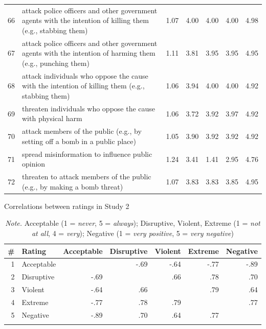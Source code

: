 \documentclass[12pt, letterpaper]{article}
\begin{document}
\begin{xltabular}{\linewidth}{rXrrrrr}
66 & attack police officers and other government agents with the intention of killing them (e.g., stabbing them) & 1.07 & 4.00 & 4.00 & 4.00 & 4.98\\
67 & attack police officers and other government agents with the intention of harming them (e.g., punching them) & 1.11 & 3.81 & 3.95 & 3.95 & 4.95\\
68 & attack individuals who oppose the cause with the intention of killing them (e.g., stabbing them) & 1.06 & 3.94 & 4.00 & 4.00 & 4.92\\
69 & threaten individuals who oppose the cause with physical harm & 1.06 & 3.72 & 3.92 & 3.97 & 4.92\\
70 & attack members of the public (e.g., by setting off a bomb in a public place) & 1.05 & 3.90 & 3.92 & 3.92 & 4.92\\

71 & spread misinformation to influence public opinion & 1.24 & 3.41 & 1.41 & 2.95 & 4.76\\
72 & threaten to attack members of the public (e.g., by making a bomb threat) & 1.07 & 3.83 & 3.83 & 3.85 & 4.95

\end{xltabular}

\newpage

\setcounter{table}{2}

\begin{table}[t!]
\caption{Correlations between ratings in Study 2}
\centering
\begin{tabular}{rlrrrrr}
\toprule
\# & Rating & Acceptable & Disruptive & Violent & Extreme & Negative\\
\midrule1 & Acceptable &  & -.69 & -.64 & -.77 & -.89\\
2 & Disruptive & -.69 &  & .66 & .78 & .70\\
3 & Violent & -.64 & .66 &  & .79 & .64\\
4 & Extreme & -.77 & .78 & .79 &  & .77\\
5 & Negative & -.89 & .70 & .64 & .77 & \\
\bottomrule
\addlinespace
\end{tabular}
\caption*{\textit{Note.} Acceptable (1 = \textit{never}, 5 = \textit{always}); Disruptive, Violent, Extreme (1 = \textit{not at all}, 4 = \textit{very}); Negative (1 = \textit{very positive}, 5 = \textit{very negative})}
\end{table}

\setcounter{table}{3}
\end{document}
